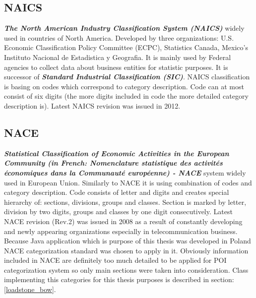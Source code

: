\subsection{NAICS}
\textit{\textbf{The North American Industry Classification System (NAICS)}} widely used in countries of North America. Developed by three organizations:  U.S. Economic Classification Policy Committee (ECPC), Statistics Canada, Mexico's Instituto Nacional de Estadistica y Geografia. It is mainly used by Federal agencies to collect data about business entities for statistic purposes. It is successor of \textit{\textbf{Standard Industrial Classification (SIC)}}. NAICS classification is basing on codes which correspond to category description. Code can at most consist of six digits (the more digits included in code the more detailed category description is). Latest NAICS revision was issued in 2012. \cite{15} \cite{16}
\subsection{NACE}
\label{NACE}
\textit{\textbf{Statistical Classification of Economic Activities in the European Community (in French: Nomenclature statistique des activités économiques dans la Communauté européenne) - NACE}} system widely used in European Union. Similarly to NACE it is using combination of codes and category description. Code consists of letter and digits and creates special hierarchy of: sections, divisions, groups and classes. Section is marked by letter, division by two digits, groups and classes by one digit consecutively. Latest NACE revision (Rev.2) was issued in 2008 as a result of constantly developing and  newly appearing organizations especially in telecommunication business.\cite{17} \cite{18} Because Java application which is purpose of this thesis was developed in Poland NACE categorization standard was chosen to apply in it. Obviously information included in NACE are definitely too much detailed to be applied for POI categorization system so only main sections were taken into consideration. \cite{31} Class implementing this categories for this thesis purposes is described in section: \ref{loadstone_bow}.

